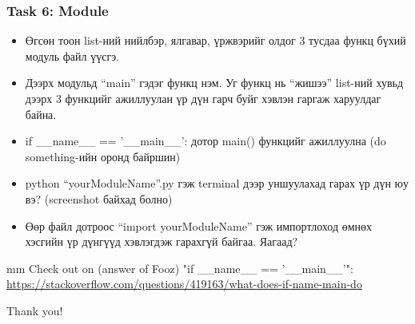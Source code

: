 \documentclass{beamer}
\begin{document}
\begin{frame}
    \frametitle{Task 6: Module}   
\tiny
    \begin{itemize}
        \item Өгсөн тоон list-ний нийлбэр, ялгавар, үржвэрийг олдог 3 тусдаа функц бүхий модуль файл үүсгэ. 
        \item Дээрх модульд “main” гэдэг функц нэм. Уг функц нь “жишээ” list-ний хувьд дээрх 3 функцийг ажиллуулан үр дүн гарч буйг хэвлэн гаргаж харуулдаг байна.
        \item if {\_\_name\_\_ == '\_\_main\_\_'}: дотор main() функцийг ажиллуулна (do something-ийн оронд байршин)
        \item python  “yourModuleName”.py гэж terminal дээр уншуулахад гарах үр дүн юу вэ? (screenshot байхад болно)
        \item Өөр файл дотроос “import yourModuleName” гэж импортлоход өмнөх хэсгийн үр дүнгүүд хэвлэгдэж гарахгүй байгаа. Яагаад?        
    \end{itemize}

 mm
    Check out on (answer of Fooz) "if \_\_name\_\_ == '\_\_main\_\_'": \\
    \url{https://stackoverflow.com/questions/419163/what-does-if-name-main-do}

\end{frame}

\begin{frame}
\Huge{\centerline{Thank you!}}
\end{frame}

\end{document}
